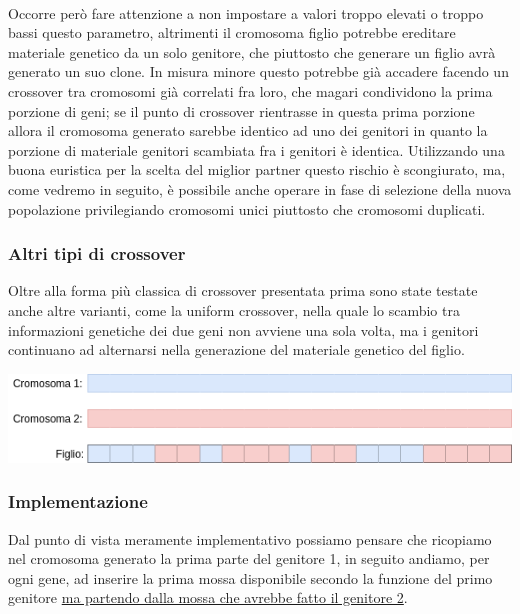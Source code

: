 \documentclass{article}
\begin{document}
\paragraph{}
Occorre però fare attenzione a non impostare a valori troppo elevati o troppo bassi questo parametro, altrimenti il cromosoma figlio potrebbe ereditare materiale genetico da un solo genitore, che piuttosto che generare un figlio avrà generato un suo clone. In misura minore questo potrebbe già accadere facendo un crossover tra cromosomi già correlati fra loro, che magari condividono la prima porzione di geni; se il punto di crossover rientrasse in questa prima porzione allora il cromosoma generato sarebbe identico ad uno dei genitori in quanto la porzione di materiale genitori scambiata fra i genitori è identica. Utilizzando una buona euristica per la scelta del miglior partner questo rischio è scongiurato, ma, come vedremo in seguito, è possibile anche operare in fase di selezione della nuova popolazione privilegiando cromosomi unici piuttosto che cromosomi duplicati.

\subsubsection{Altri tipi di crossover}
Oltre alla forma più classica di crossover presentata prima sono state testate anche altre varianti, come la uniform crossover, nella quale lo scambio tra informazioni genetiche dei due geni non avviene una sola volta, ma i genitori continuano ad alternarsi nella generazione del materiale genetico del figlio.

\begin{center}
    \includegraphics[scale=0.6]{media/unicode.png}
\end{center}

\subsubsection{Implementazione}
Dal punto di vista meramente implementativo possiamo pensare che ricopiamo nel cromosoma generato la prima parte del genitore 1, in seguito andiamo, per ogni gene, ad inserire la prima mossa disponibile secondo la funzione del primo genitore \underline{ma partendo dalla mossa che avrebbe fatto il genitore 2}. 
\end{document}

